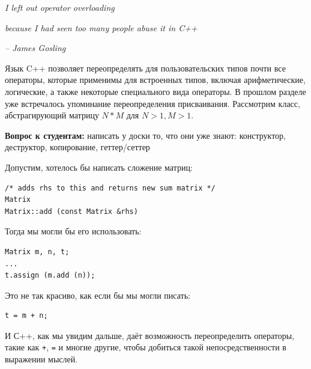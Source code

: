 \documentclass[a4paper,12pt,oneside]{article}
\newif\ifanswers
\begin{document}
\hfill\textit{I left out operator overloading}

\hfill\textit{because I had seen too many people abuse it in C++}{\vspace{0.5em}}

\hfill\textit{-- James Gosling}

Язык C++ позволяет переопределять для пользовательских типов почти все операторы, которые применимы для встроенных типов, включая арифметические, логические, а также некоторые специального вида операторы. В прошлом разделе уже встречалось упоминание переопределения присваивания. Рассмотрим класс, абстрагирующий матрицу $N*M$ для $N>1, M>1$.

\textbf{Вопрос к студентам:} написать у доски то, что они уже знают: конструктор, деструктор, копирование, геттер/сеттер

\ifanswers
Возможный ответ:

\begin{lstlisting}
class Matrix
{
public:
  Matrix (int n, int m) : m_n (n), m_m (m), m_buf (new int[n*m]()) {}
  ~Matrix () { delete [] m_buf; }

  Matrix (const Matrix &rhs) : m_n (rhs.m_n), m_m (rhs.m_m), m_buf (new int[m_n * m_m])
    {
      std::memcpy (m_buf, rhs.m_buf, rhs.m_n * rhs.m_m * sizeof (int));
    }

  void set (int x, int y, int val) { m_buf[x*m_m + y] = val; }
  int get (int x, int y) { return m_buf[x*m_m + y]; }

private:
  int m_n, m_m;
  int *m_buf;
};
\end{lstlisting}
\fi

Допустим, хотелось бы написать сложение матриц:

\begin{lstlisting}
/* adds rhs to this and returns new sum matrix */
Matrix
Matrix::add (const Matrix &rhs)
\end{lstlisting}

Тогда мы могли бы его использовать:

\begin{lstlisting}
Matrix m, n, t;
...
t.assign (m.add (n));
\end{lstlisting}

Это не так красиво, как если бы мы могли писать:

\begin{lstlisting}
t = m + n;
\end{lstlisting}

И С++, как мы увидим дальше, даёт возможность переопределить операторы, такие как \lstinline!+!, \lstinline!=! и многие другие, чтобы добиться такой непосредственности в выражении мыслей.
\end{document}
